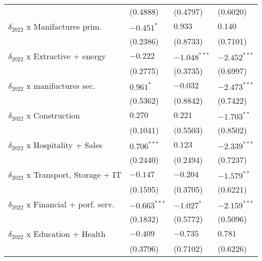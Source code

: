\begin{tabular}{llll}
                                                   &           (0.4888) &           (0.4797) &           (0.6020) \\
$\delta_{2022}$ x Manifactures prim.               &         $-0.451^*$ &            $0.933$ &            $0.140$ \\
                                                   &           (0.2386) &           (0.8733) &           (0.7101) \\
$\delta_{2022}$ x Extractive + energy              &           $-0.222$ &     $-1.048^{***}$ &     $-2.452^{***}$ \\
                                                   &           (0.2775) &           (0.3735) &           (0.6997) \\
$\delta_{2022}$ x manifuctures sec.                &          $0.961^*$ &           $-0.032$ &     $-2.473^{***}$ \\
                                                   &           (0.5362) &           (0.8842) &           (0.7422) \\
$\delta_{2022}$ x Construction                     &            $0.270$ &            $0.221$ &      $-1.703^{**}$ \\
                                                   &           (0.1041) &           (0.5503) &           (0.8502) \\
$\delta_{2022}$ x Hospitality + Sales              &      $0.706^{***}$ &            $0.123$ &     $-2.339^{***}$ \\
                                                   &           (0.2440) &           (0.2494) &           (0.7237) \\
$\delta_{2022}$ x Transport, Storage + IT          &           $-0.147$ &           $-0.204$ &      $-1.579^{**}$ \\
                                                   &           (0.1595) &           (0.3705) &           (0.6221) \\
$\delta_{2022}$ x Financial + porf. serv.          &     $-0.663^{***}$ &         $-1.027^*$ &     $-2.159^{***}$ \\
                                                   &           (0.1832) &           (0.5772) &           (0.5096) \\
$\delta_{2022}$ x Education + Health               &           $-0.409$ &           $-0.735$ &            $0.781$ \\
                                                   &           (0.3796) &           (0.7102) &           (0.6226) \\

\end{tabular}
